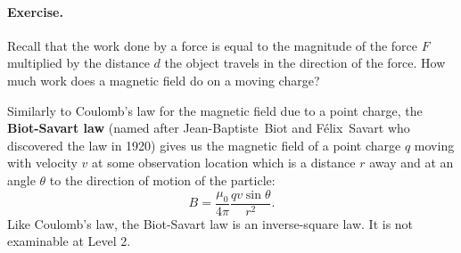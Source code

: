 \documentclass[a4paper]{amsbook}
\begin{document}
\paragraph{Exercise.} Recall that the work done by a force is equal to the magnitude of the force $ F $ multiplied by the
distance $ d $ the object travels in the direction of the force. How much work does a magnetic field do on a moving charge?

Similarly to Coulomb's law for the magnetic field due to a point charge, the \textbf{Biot-Savart law} (named after Jean-Baptiste~Biot and F\'elix~Savart
who discovered the law in 1920) gives us the magnetic field of a point charge $ q $ moving with velocity $ v $ at some observation location which is a
distance $ r $ away and at an angle $ \theta $ to the direction of motion of the particle:
\begin{equation}
  B = \frac{\mu_0}{4\pi} \frac{qv \sin \theta}{r^2}.
\end{equation}
Like Coulomb's law, the Biot-Savart law is an inverse-square law. It is not examinable at Level 2.
\end{document}
